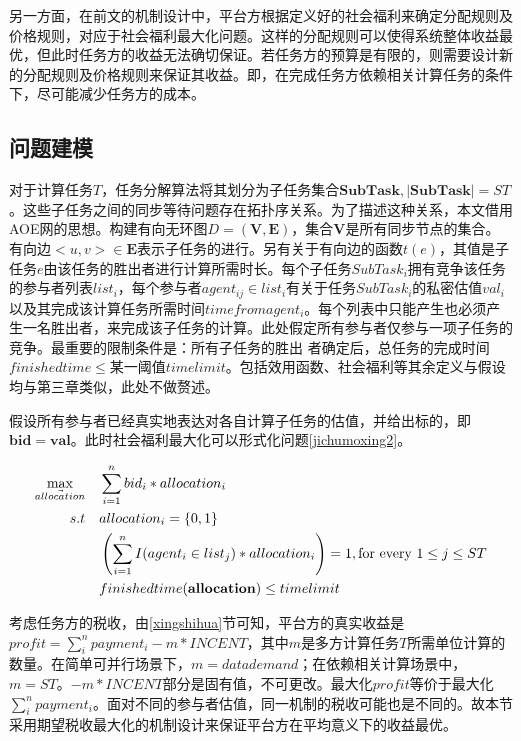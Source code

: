 \documentclass[promaster]{thesis-uestc}
\begin{document}
另一方面，在前文的机制设计中，平台方根据定义好的社会福利来确定分配规则及价格规则，对应于社会福利最大化问题。这样的分配规则可以使得系统整体收益最优，但此时任务方的收益无法确切保证。若任务方的预算是有限的，则需要设计新的分配规则及价格规则来保证其收益。即，在完成任务方依赖相关计算任务的条件下，尽可能减少任务方的成本。

\FloatBarrier

\subsection{问题建模}

对于计算任务$T$，任务分解算法将其划分为子任务集合$\mathbf{SubTask},|\mathbf{SubTask}| = ST$。这些子任务之间的同步等待问题存在拓扑序关系。为了描述这种关系，本文借用AOE网的思想。构建有向无环图$D=(\mathbf{V},\mathbf{E})$，集合$\mathbf{V}$是所有同步节点的集合。有向边$<u,v> \in \mathbf{E}$表示子任务的进行。另有关于有向边的函数$t(e)$，其值是子任务$e$由该任务的胜出者进行计算所需时长。每个子任务$SubTask_i$拥有竞争该任务的参与者列表$list_i$，每个参与者$agent_{ij} \in list_i$有关于任务$SubTask_i$的私密估值$val_i$以及其完成该计算任务所需时间$timefromagent_i$。每个列表中只能产生也必须产生一名胜出者，来完成该子任务的计算。此处假定所有参与者仅参与一项子任务的竞争。最重要的限制条件是：所有子任务的胜出
者确定后，总任务的完成时间$finishedtime \leq $某一阈值$timelimit$。包括效用函数、社会福利等其余定义与假设均与第三章类似，此处不做赘述。

假设所有参与者已经真实地表达对各自计算子任务的估值，并给出标的，即$\mathbf{bid}=\mathbf{val}$。此时社会福利最大化可以形式化问题\ref{jichumoxing2}。

\begin{align}
    \label{jichumoxing2}
    \max_{\vec{allocation}} \quad&\sum_{i=1}^{n}{bid_i*allocation_i}\\
    s.t                     \quad&allocation_i = \{0,1\}\notag\\
    \quad&\left(\sum_{i=1}^{n}{I(agent_i \in list_j)*allocation_i}\right) = 1,\text{for every }1 \leq j \leq ST\notag\\
    \quad&finishedtime(\mathbf{allocation}) \leq timelimit
    \notag
\end{align}


考虑任务方的税收，由\ref{xingshihua}节可知，平台方的真实收益是$profit = \sum_{i}^{n}{payment_i}-m*INCENT$，其中$m$是多方计算任务$T$所需单位计算的数量。在简单可并行场景下，$m=datademand$；在依赖相关计算场景中，$m=ST$。$-m*INCENT$部分是固有值，不可更改。最大化$profit$等价于最大化$\sum_{i}^{n}{payment_i}$。面对不同的参与者估值，同一机制的税收可能也是不同的。故本节采用期望税收最大化的机制设计来保证平台方在平均意义下的收益最优。
\end{document}
